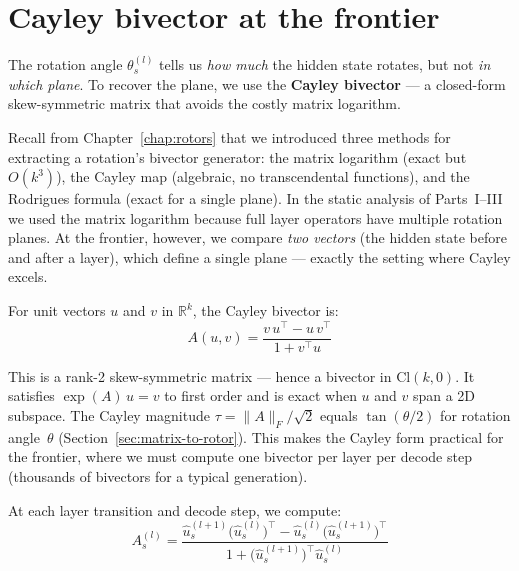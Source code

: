\documentclass[11pt, twoside, openright]{memoir}
\numberwithin{equation}{chapter}
\begin{document}
\section{Cayley bivector at the frontier}
\label{sec:frontier-cayley}

The rotation angle $\theta^{(l)}_s$ tells us \emph{how much} the
hidden state rotates, but not \emph{in which plane}.  To recover the
plane, we use the \textbf{Cayley bivector} --- a closed-form
skew-symmetric matrix that avoids the costly matrix logarithm.

Recall from Chapter~\ref{chap:rotors} that we introduced three
methods for extracting a rotation's bivector generator: the matrix
logarithm (exact but $O(k^3)$), the Cayley map (algebraic, no
transcendental functions), and the Rodrigues formula (exact for a
single plane).  In the static analysis of Parts~I--III we used the
matrix logarithm because full layer operators have multiple rotation
planes.  At the frontier, however, we compare \emph{two vectors}
(the hidden state before and after a layer), which define a single
plane --- exactly the setting where Cayley excels.

\begin{keyidea}
For unit vectors $u$ and $v$ in $\mathbb{R}^k$, the Cayley bivector
is:
\begin{equation}
  A(u, v) = \frac{v\,u^\top - u\,v^\top}{1 + v^\top u}
\end{equation}

This is a rank-2 skew-symmetric matrix --- hence a bivector in
$\mathrm{Cl}(k,0)$.  It satisfies $\exp(A) \, u = v$ to first
order and is exact when $u$ and $v$ span a 2D subspace.
The Cayley magnitude $\tau = \|A\|_F / \sqrt{2}$ equals
$\tan(\theta/2)$ for rotation angle~$\theta$
(Section~\ref{sec:matrix-to-rotor}).
This makes the Cayley form practical for the frontier, where we must
compute one bivector per layer per decode step (thousands of
bivectors for a typical generation).
\end{keyidea}

At each layer transition and decode step, we compute:
\begin{equation}
  A^{(l)}_s
  = \frac{
      \hat{u}^{(l+1)}_s \bigl(\hat{u}^{(l)}_s\bigr)^\top
      - \hat{u}^{(l)}_s \bigl(\hat{u}^{(l+1)}_s\bigr)^\top
    }{
      1 + \bigl(\hat{u}^{(l+1)}_s\bigr)^\top \hat{u}^{(l)}_s
    }
\end{equation}
\end{document}
